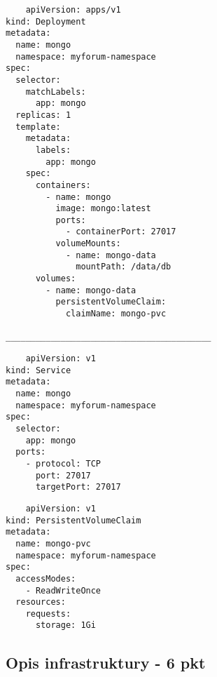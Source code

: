 \documentclass[12pt,a4paper]{article}
\begin{document}
\begin{verbatim}
    apiVersion: apps/v1
kind: Deployment
metadata:
  name: mongo
  namespace: myforum-namespace
spec:
  selector:
    matchLabels:
      app: mongo
  replicas: 1
  template:
    metadata:
      labels:
        app: mongo
    spec:
      containers:
        - name: mongo
          image: mongo:latest
          ports:
            - containerPort: 27017
          volumeMounts:
            - name: mongo-data
              mountPath: /data/db
      volumes:
        - name: mongo-data
          persistentVolumeClaim:
            claimName: mongo-pvc

_________________________________________
\end{verbatim}

\begin{verbatim}
    apiVersion: v1
kind: Service
metadata:
  name: mongo
  namespace: myforum-namespace
spec:
  selector:
    app: mongo
  ports:
    - protocol: TCP
      port: 27017
      targetPort: 27017
\end{verbatim}

\begin{verbatim}
    apiVersion: v1
kind: PersistentVolumeClaim
metadata:
  name: mongo-pvc
  namespace: myforum-namespace
spec:
  accessModes:
    - ReadWriteOnce
  resources:
    requests:
      storage: 1Gi

\end{verbatim}

\subsection{Opis infrastruktury - 6 pkt}
\label{sec:Users}
\end{document}
